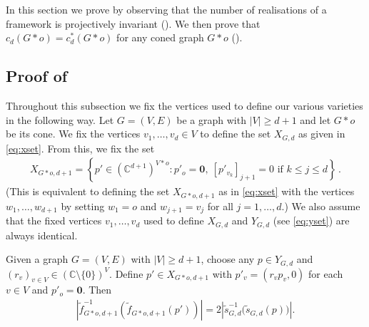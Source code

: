 In this section we prove  by observing that the number of realisations of a framework is projectively invariant ().
We then prove that $c_d(G*o) = c_d^*(G*o)$ for any coned graph $G*o$ ().

\subsection{Proof of \texorpdfstring{}{Theorem 1.2}}

Throughout this subsection we fix the vertices used to define our various varieties in the following way.
Let $G=(V,E)$ be a graph with $|V| \geq d+1$ and let $G*o$ be its cone.
We fix the vertices $v_1,\ldots, v_d \in V$ to define the set $X_{G,d}$ as given in \eqref{eq:xset}.
From this, we fix the set
\begin{align*}
	X_{G*o,d+1} = \left\{ p' \in (\mathbb{C}^{d+1})^{V*o} : p'_o = \mathbf{0}, ~  [p'_{v_k}]_{j+1}=0 \text{ if } k \leq j \leq d  \right\}\,.
\end{align*}
(This is equivalent to defining the set $X_{G*o,d+1}$ as in \eqref{eq:xset} with the vertices $w_1,\ldots,  w_{d+1}$ by setting $w_1 = o$ and $w_{j+1} = v_j$ for all $j =1,\ldots, d$.)
We also assume that the fixed vertices $v_1,\ldots,v_d$ used to define $X_{G,d}$ and $Y_{G,d}$ (see \eqref{eq:yset}) are always identical.



\begin{lemma}\label{kl:proj}
	Given a graph $G=(V,E)$ with $|V| \geq d+1$,
	choose any $p \in Y_{G,d}$ and $(r_v)_{v \in V} \in (\mathbb{C}\setminus \{0\})^{V}$.
	Define $p' \in X_{G*o,d+1}$ with $p'_v = (r_vp_v,0)$ for each $v \in V$ and $p'_o=\mathbf{0}$.
	Then
	\begin{align*}
		\left| \tilde{f}_{G*o,d+1}^{-1}\left(\tilde{f}_{G*o,d+1}(p') \right) \right| = 2 \left| \tilde{s}_{G,d}^{-1}\Big(\tilde{s}_{G,d}(p) \Big) \right|.
	\end{align*} 
\end{lemma}

